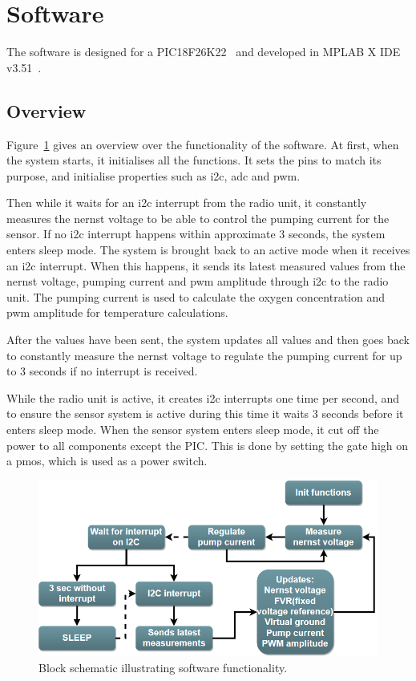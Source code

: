 \section{Software}

The software is designed for a PIC18F26K22~\cite{PIC18} and developed in MPLAB X IDE v3.51~\cite{MPLAB}.

\subsection{Overview}

Figure~\ref{fig:Software_map} gives an overview over the functionality of the software. At first, when the system starts, it initialises all the functions. It sets the pins to match its purpose, and initialise properties such as \ac{i2c}, \ac{adc} and \ac{pwm}.

Then while it waits for an \ac{i2c} interrupt from the radio unit, it constantly measures the nernst voltage to be able to control the pumping current for the sensor. If no \ac{i2c} interrupt happens within approximate 3 seconds, the system enters sleep mode. The system is brought back to an active mode when it receives an \ac{i2c} interrupt. When this happens, it sends its latest measured values from the nernst voltage, pumping current and \ac{pwm} amplitude through \ac{i2c} to the radio unit. The pumping current is used to calculate the oxygen concentration and \ac{pwm} amplitude for temperature calculations.

After the values have been sent, the system updates all values and then goes back to constantly measure the nernst voltage to regulate the pumping current for up to 3 seconds if no interrupt is received.

While the radio unit is active, it creates \ac{i2c} interrupts one time per second, and to ensure the sensor system is active during this time it waits 3 seconds before it enters sleep mode. When the sensor system enters sleep mode, it cut off the power to all components except the PIC. This is done by setting the gate high on a \ac{pmos}, which is used as a power switch.



\begin{figure}
    \centering
    \includegraphics[width=\textwidth]{Chapter3/Figures/Software_map.png}
    \caption{Block schematic illustrating software functionality.}
    \label{fig:Software_map}
\end{figure}


